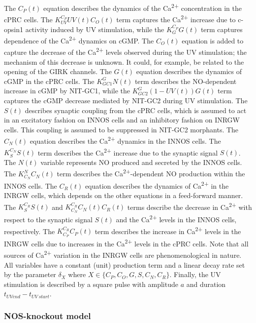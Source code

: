 \documentclass[
  10pt,
  onecolumn]{article}
\begin{document}
The \(C_P(t)\) equation describes the dynamics of the
Ca\textsuperscript{2+} concentration in the cPRC cells. The
\(K_{UV}^{C_P} UV(t) C_O(t)\) term captures the Ca\textsuperscript{2+}
increase due to c-opsin1 activity induced by UV stimulation, while the
\(K_{G}^{C_P} G(t)\) term captures dependence of the
Ca\textsuperscript{2+} dynamics on cGMP. The \(C_O(t)\) equation is
added to capture the decrease of the Ca\textsuperscript{2+} levels
observed during the UV stimulation; the mechanism of this decrease is
unknown. It could, for example, be related to the opening of the GIRK
channels. The \(G(t)\) equation describes the dynamics of cGMP in the
cPRC cells. The \(K_{GC1}^G N(t)\) term describes the NO-dependent
increase in cGMP by NIT-GC1, while the
\(K_{GC2}^G \left(1 - UV(t)\right) G(t)\) term captures the cGMP
decrease mediated by NIT-GC2 during UV stimulation. The \(S(t)\)
describes synaptic coupling from the cPRC cells, which is assumed to act
in an excitatory fashion on INNOS cells and an inhibitory fashion on
INRGW cells. This coupling is assumed to be suppressed in NIT-GC2
morphants. The \(C_N(t)\) equation describes the Ca\textsuperscript{2+}
dynamics in the INNOS cells. The \(K_{S}^{C_N} S(t)\) term describes the
Ca\textsuperscript{2+} increase due to the synaptic signal \(S(t)\). The
\(N(t)\) variable represents NO produced and secreted by the INNOS
cells. The \(K_{C_N}^{N} C_N(t)\) term describes the
Ca\textsuperscript{2+}-dependent NO production within the INNOS cells.
The \(C_R(t)\) equation describes the dynamics of Ca\textsuperscript{2+}
in the INRGW cells, which depends on the other equations in a
feed-forward manner. The \(K_{S}^{C_R} S(t)\) and
\(K_{C_N}^{C_R} C_N(t) C_R(t)\) terms describe the decrease in
Ca\textsuperscript{2+} with respect to the synaptic signal \(S(t)\) and
the Ca\textsuperscript{2+} levels in the INNOS cells, respectively. The
\(K_{C_P}^{C_R} C_P(t)\) term describes the increase in
Ca\textsuperscript{2+} levels in the INRGW cells due to increases in the
Ca\textsuperscript{2+} levels in the cPRC cells. Note that all sources
of Ca\textsuperscript{2+} variation in the INRGW cells are
phenomenological in nature. All variables have a constant (unit)
production term and a linear decay rate set by the parameter
\(\delta_X\) where \(X \in \{ C_P, C_O, G, S, C_N, C_R\}\). Finally, the
UV stimulation is described by a square pulse with amplitude \(a\) and
duration \(t_{UV end} - t_{UV \: start}\).

\hypertarget{nos-knockout-model}{%
\subsubsection{NOS-knockout model}\label{nos-knockout-model}}
\end{document}
